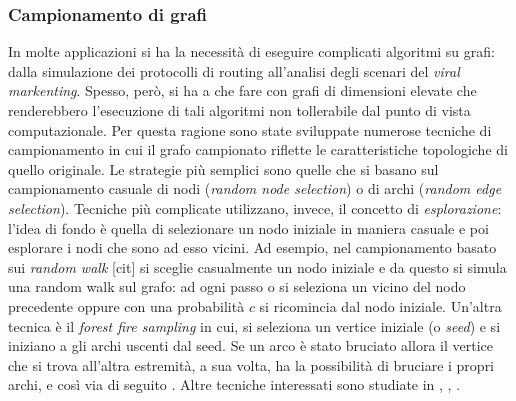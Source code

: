\subsubsection{Campionamento di grafi}
In molte applicazioni si ha la necessit\`a di eseguire complicati algoritmi su grafi: dalla simulazione dei protocolli di routing all'analisi degli scenari del \textit{viral markenting}. Spesso, per\`o, si ha a che fare con grafi di dimensioni elevate che renderebbero l'esecuzione di tali algoritmi non tollerabile dal punto di vista computazionale. Per questa ragione sono state sviluppate numerose tecniche di campionamento in cui il grafo campionato riflette le caratteristiche topologiche di quello originale. Le strategie pi\`u semplici sono quelle che si basano sul campionamento casuale di nodi (\textit{random node selection}) o di archi (\textit{random edge selection}). 
Tecniche pi\`u complicate utilizzano, invece, il concetto di \textit{esplorazione}: l'idea di fondo \`e quella di selezionare un nodo iniziale in maniera casuale e poi esplorare i nodi che sono ad esso vicini. Ad esempio, nel campionamento basato sui \textit{random walk} [cit] si sceglie casualmente un nodo iniziale e da questo si simula una random walk sul grafo: ad ogni passo o si seleziona un vicino del nodo precedente oppure con una probabilit\`a $ c $ si ricomincia dal nodo iniziale. Un'altra tecnica \`e il \textit{forest fire sampling} in cui, si seleziona un vertice iniziale (o \textit{seed}) e si iniziano a  gli archi uscenti dal seed. Se un arco \`e stato bruciato allora il vertice che si trova all'altra estremit\`a, a sua volta, ha la possibilit\`a di bruciare i propri archi, e cos\`i via di seguito \cite{Leskovec2006}. Altre tecniche interessati sono studiate in \cite{Krishnamurthy05}, \cite{Adler2001}, \cite{Airoldi05}.

